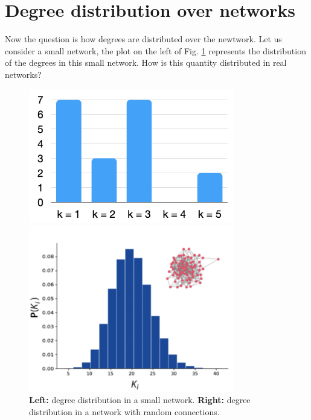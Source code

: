 \documentclass[../main/main.tex]{subfiles}
\begin{document}
\section{Degree distribution over networks}
Now the question is how degrees are distributed over the newtwork. Let us consider a small network, the plot on the left of Fig. \ref{fig:07_2} represents the distribution of the degrees in this small network. How is this quantity distributed in real networks?

\begin{figure}[h!]
\begin{minipage}[c]{0.5\linewidth}
\centering
\includegraphics[width=0.8\textwidth]{../lessons/image/07/2.png}
\end{minipage}
\begin{minipage}[]{0.5\linewidth}
\centering
\includegraphics[width=0.8\textwidth]{../lessons/image/07/3.png}
\end{minipage}
\caption{\label{fig:07_2} \textbf{Left:} degree distribution in a small network. \textbf{Right:} degree distribution in a network with random connections. }
\end{figure}
\end{document}
